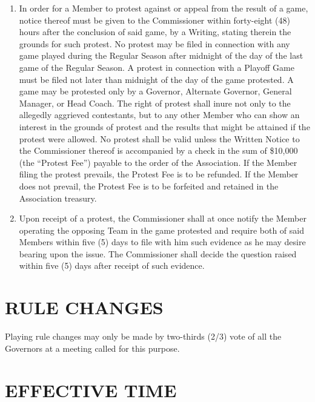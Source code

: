 \documentclass[]{book}
\providecommand{\tightlist}{%
  \setlength{\itemsep}{0pt}\setlength{\parskip}{0pt}}
\theoremstyle{definition}
\theoremstyle{definition}
\theoremstyle{definition}
\theoremstyle{remark}
\begin{document}
\begin{enumerate}
\def\labelenumi{(\alph{enumi})}
\tightlist
\item
  In order for a Member to protest against or appeal from the result of
  a game, notice thereof must be given to the Commissioner within
  forty-eight (48) hours after the conclusion of said game, by a
  Writing, stating therein the grounds for such protest. No protest may
  be filed in connection with any game played during the Regular Season
  after midnight of the day of the last game of the Regular Season. A
  protest in connection with a Playoff Game must be filed not later than
  midnight of the day of the game protested. A game may be protested
  only by a Governor, Alternate Governor, General Manager, or Head
  Coach. The right of protest shall inure not only to the allegedly
  aggrieved contestants, but to any other Member who can show an
  interest in the grounds of protest and the results that might be
  attained if the protest were allowed. No protest shall be valid unless
  the Written Notice to the Commissioner thereof is accompanied by a
  check in the sum of \$10,000 (the ``Protest Fee'') payable to the
  order of the Association. If the Member filing the protest prevails,
  the Protest Fee is to be refunded. If the Member does not prevail, the
  Protest Fee is to be forfeited and retained in the Association
  treasury.
\item
  Upon receipt of a protest, the Commissioner shall at once notify the
  Member operating the opposing Team in the game protested and require
  both of said Members within five (5) days to file with him such
  evidence as he may desire bearing upon the issue. The Commissioner
  shall decide the question raised within five (5) days after receipt of
  such evidence.
\end{enumerate}

\section{RULE CHANGES}\label{rule-changes}

Playing rule changes may only be made by two-thirds (2/3) vote of all
the Governors at a meeting called for this purpose.

\section{EFFECTIVE TIME}\label{effective-time}
\end{document}
